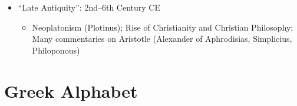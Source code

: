 \documentclass[oneside]{article}
\begin{document}
\begin{itemize}
\begin{itemize}
\end{itemize}
\item{``Late Antiquity'': 2nd--6th Century CE}
\begin{itemize}
\item{Neoplatonism (Plotinus); Rise of Christianity and Christian Philosophy; Many commentaries on Aristotle (Alexander of Aphrodisias, Simplicius, Philoponous)}
\end{itemize}
\end{itemize}






\section*{Greek Alphabet}
\end{document}
